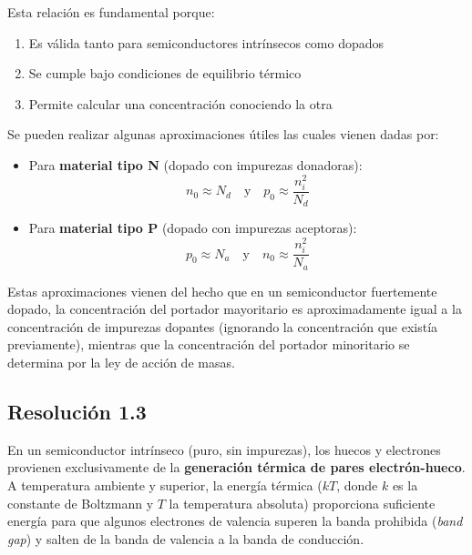 \documentclass[
  11pt,
  letterpaper,
   addpoints,
  ]{exam}
\begin{document}
\begin{questions}
\begin{solution}
Esta relación es fundamental porque:
\begin{enumerate}
    \item Es válida tanto para semiconductores intrínsecos como dopados
    \item Se cumple bajo condiciones de equilibrio térmico
    \item Permite calcular una concentración conociendo la otra
\end{enumerate}

Se pueden realizar algunas aproximaciones útiles las cuales vienen dadas por:
\begin{itemize}
    \item Para \textbf{material tipo N} (dopado con impurezas donadoras):
    \begin{equation}
        n_0 \approx N_d \quad \text{y} \quad p_0 \approx \frac{n_i^2}{N_d}
    \end{equation}
    \item Para \textbf{material tipo P} (dopado con impurezas aceptoras):
    \begin{equation}
        p_0 \approx N_a \quad \text{y} \quad n_0 \approx \frac{n_i^2}{N_a}
    \end{equation}
\end{itemize}

Estas aproximaciones vienen del hecho que en un semiconductor fuertemente dopado, la concentración del portador mayoritario es aproximadamente igual a la concentración de impurezas dopantes (ignorando la concentración que existía previamente), mientras que la concentración del portador minoritario se determina por la ley de acción de masas.

\subsection*{Resolución 1.3}
En un semiconductor intrínseco (puro, sin impurezas), los huecos y electrones provienen exclusivamente de la \textbf{generación térmica de pares electrón-hueco}. A temperatura ambiente y superior, la energía térmica ($kT$, donde $k$ es la constante de Boltzmann y $T$ la temperatura absoluta) proporciona suficiente energía para que algunos electrones de valencia superen la banda prohibida (\emph{band gap}) y salten de la banda de valencia a la banda de conducción.


\end{solution}
\end{questions}
\end{document}
